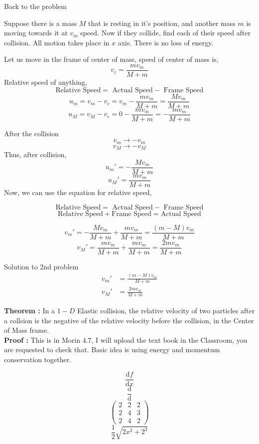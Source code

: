 \documentclass[9pt,serif]{beamer}
\newcommand{\prob}[1]{ \begin{problem.} #1 \end{problem.}}
\begin{document}
\begin{frame}
    {Back to the problem}
    \prob{Suppose there is a mass $M$ that is resting in it's position, and another mass $m$ is moving towards it at $v_m$ speed. Now if they collide, find each of their speed after collision. All motion takes place in $x$ axis. There is no loss of energy.\pause}
    {\begin{small}Let us move in the frame of center of mass, speed of center of mass is, 
        \[ v_c = \frac{m v_m}{M + m} \]
        Relative speed of anything, 
        \[ \text{Relative Speed} =\text{ Actual Speed} -\text{ Frame Speed} \]
        \[ u_m = v_m - v_c = v_m - \frac{mv_m}{M + m} = \frac{M v_m}{M + m} \]
       \[ u_M = v_M - v_c = 0 - \frac{mv_m}{M + m} =  - \frac{mv_m}{M + m}  \]
        
\end{small}} 
\end{frame}

\begin{frame}
    {After the collision}
    \[ v_m \to -v_m \]
    \[ v_M \to -v_M \]
    Thus, after collision,
    \[ u_m' = - \frac{M v_m}{M + m}  \]
    \[ u_M ' = \frac{mv_m}{M+m} \]
    Now, we can use the equation for relative speed, 
    
        \[ \text{Relative Speed} =\text{ Actual Speed} -\text{ Frame Speed} \]
        \[ \text{Relative Speed} + \text{Frame Speed} = \text{Actual Speed} \]
    
        \[ v_m'  = -\frac{Mv_m}{M+m} +   \frac{mv_m}{M+m } = \frac{\left( m - M \right) v_m}{M + m}       \]
        \[ v_M' =  \frac{mv_m}{M+m}  +  \frac{mv_m}{M+m} =  \frac{2mv_m}{M+m}   \]
        
\end{frame}
\begin{frame}
    {Solution to 2nd problem}
    \begin{align*}
        v_m' &= \frac{\left( m - M \right) v_m}{M + m} \\
        v_M' &=  \frac{2mv_m}{M+m} 
    \end{align*}
    
\end{frame}


\begin{frame}
    \textbf{Theorem :   } In a $1-D$ Elastic collision, the relative velocity of two particles after a collsion is the negative of the relative velocity before the collision, in the Center of Mass frame. \\
    \textbf{Proof :} This is in Morin $4.7$, I will upload the text book in the Classroom, you are requested to check that. Basic idea is using energy and momentum conservation together.
\end{frame}









\begin{frame}
    \[ \frac{\mathrm{d} f}{\mathrm{d} x} \]
     \[ \frac{\mathrm{d} }{\mathrm{d} } \]
     \[ \begin{pmatrix} 2 & 2 & 2 \\ 
     2 & 4 & 3 \\
 2 & 4 & 2\end{pmatrix}  \]
     \[ \frac{1}{2} \sqrt{2x^2+2^3}  \]
      
\end{frame}
\end{document}
